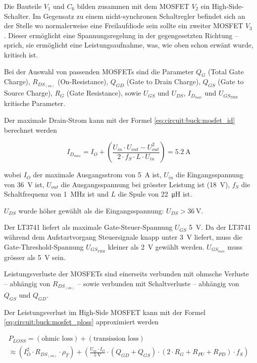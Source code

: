 Die  Bauteile  $V_1$  und  $C_6$  bilden  zusammen  mit  dem  MOSFET  $V_2$  ein
High-Side-Schalter. Im Gegensatz zu einem nicht-synchronen Schaltregler befindet
sich  an  der Stelle wo normalerweise eine Freilaufdiode sein sollte ein zweiter
MOSFET $V_3$. Dieser erm\"oglicht  eine  Spannungsregelung in der gegengesetzten
Richtung -- sprich, sie erm\"oglicht eine Leistungsaufnahme, was, wie oben schon
erw\"ant wurde, kritisch ist.

Bei  der  Auswahl von passenden MOSFETs sind die  Parameter  $Q_G$  (Total  Gate
Charge),  $R_{DS_{(on)}}$  (On-Resistance),  $Q_{GD}$  (Gate to  Drain  Charge),
$Q_{GS}$ (Gate to Source  Charge),  $R_G$  (Gate Resistance), sowie $U_{GS}$ und
$U_{DS}$, $I_{D_{max}}$ und $U_{GS_{THR}}$ kritische Parameter.

Der  maximale  Drain-Strom  kann mit der Formel  \ref{eq:circuit:buck:mosfet_id}
berechnet werden

\begin{equation}
    I_{D_{max}} = I_O + \left( \frac{U_{in} \cdot U_{out} - U_{out}^2}{2 \cdot f_S \cdot L \cdot U_{in}} \right) = \SI{5.2}{\ampere}
    \label{eq:circuit:buck:mosfet_id}
\end{equation}

wobei $I_O$ der maximale Ausgangsstrom  von  \SI{5}{\ampere}  ist,  $U_{in}$ die
Eingangsspannung von  \SI{36}{\volt}  ist,  $U_{out}$  die  Ausgangsspannung bei
gr\"osster  Leistung  ist   (\SI{18}{\volt}),   $f_S$   die  Schaltfrequenz  von
\SI{1}{\mega\hertz}  ist  und  $L$  die  Spule  von  \SI{22}{\micro\henry}  ist.

$U_{DS}$   wurde   h\"oher  gew\"ahlt  als  die  Eingangsspannung:   $U_{DS}   >
\SI{36}{\volt}$.

Der LT3741 liefert als maximale Gate-Steuer-Spannung $U_{GS}$  \SI{5}{\volt}. Da
der LT3741 w\"ahrend dem Aufstartvorgang Steuersignale knapp unter \SI{3}{\volt}
liefert,   muss   die   Gate-Threshold-Spannung   $U_{GS_{THR}}$   kleiner   als
\SI{2}{\volt} gew\"ahlt werden. $U_{GS_{min}}$ muss gr\"osser  als \SI{5}{\volt}
sein.

Leistungsverluste der MOSFETs sind einerseits verbunden mit ohmsche  Verluste --
abh\"angig  von  $R_{DS_{(on)}}$  --  sowie   verbunden  mit  Schaltverluste  --
abh\"angig von $Q_{GS}$ und $Q_{GD}$.

Der    Leistungsverlust    im    High-Side   MOSFET   kann   mit   der    Formel
\ref{eq:circuit:buck:mosfet_ploss} approximiert werden

\begin{multline}
    P_{LOSS} = (\textrm{ohmic loss}) + (\textrm{transission loss}) \\
             \approx \left( I_O^2 \cdot R_{DS_{(on)}} \cdot \rho_T \right)
                    + \left( \frac{U_{in} \cdot I_O}{\SI{5}{\volt}} \cdot \left(Q_{GD} + Q_{GS} \right) \cdot \left( 2 \cdot R_G + R_{PU} + R_{PD} \right) \cdot f_S \right) \\
    \label{eq:circuit:buck:mosfet_ploss}
\end{multline}

